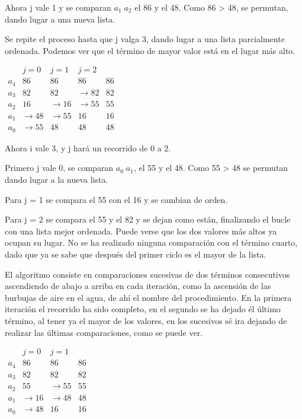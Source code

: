 \documentclass[8pt, A4]{article}    %
\begin{document}
Ahora j vale 1 y se comparan ${\displaystyle a_{1}\;a_{2}}$ el 86 y el 48. Como 86 > 48, se permutan, dando lugar a una nueva lista.

Se repite el proceso hasta que j valga 3, dando lugar a una lista parcialmente ordenada. Podemos ver que el término de mayor valor está en el lugar más alto.

\begin{table}[h]
\centering
 $\begin{array}{r||r|r|r|r}
            & j =  0 & j =  1 & j =  2 &    \\
      \hline
      a_{4} &     86 &     86 &     86 & 86 \\
      a_{3} &     82 &     82 & \to 82 & 82 \\
      a_{2} &     16 & \to 16 & \to 55 & 55 \\
      a_{1} & \to 48 & \to 55 &     16 & 16 \\
      a_{0} & \to 55 &     48 &     48 & 48
   \end{array}$
\end{table}

Ahora i vale 3, y j hará un recorrido de 0 a 2.

Primero j vale 0, se comparan ${\displaystyle a_{0}\;a_{1}}$, el 55 y el 48. Como 55 > 48 se permutan dando lugar a la nueva lista.

Para j = 1 se compara el 55 con el 16 y se cambian de orden.

Para j = 2 se compara el 55 y el 82 y se dejan como están, finalizando el bucle con una lista mejor ordenada. Puede verse que los dos valores más altos ya ocupan su lugar. No se ha realizado ninguna comparación con el término cuarto, dado que ya se sabe que después del primer ciclo es el mayor de la lista.

El algoritmo consiste en comparaciones sucesivas de dos términos consecutivos ascendiendo de abajo a arriba en cada iteración, como la ascensión de las burbujas de aire en el agua, de ahí el nombre del procedimiento. En la primera iteración el recorrido ha sido completo, en el segundo se ha dejado él último término, al tener ya el mayor de los valores, en los sucesivos sé ira dejando de realizar las últimas comparaciones, como se puede ver.

\begin{table}[h]
\centering
 $\begin{array}{r||r|r|r}
            & j =  0 & j =  1 &    \\
      \hline
      a_{4} &     86 &     86 & 86 \\
      a_{3} &     82 &     82 & 82 \\
      a_{2} &     55 & \to 55 & 55 \\
      a_{1} & \to 16 & \to 48 & 48 \\
      a_{0} & \to 48 &     16 & 16
   \end{array}$
\end{table}
\end{document}
